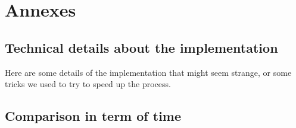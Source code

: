 \documentclass[14pt,a4paper]{article}
\theoremstyle{definition}
\numberwithin{equation}{subsection}
\begin{document}
\newpage
{}
\section*{Annexes}
\label{sec:annexes}
\subsection*{Technical details about the implementation}

Here are some details of the implementation that might seem strange, or some tricks we used to try to speed up the process.
\subsection*{Comparison in term of time}
\end{document}
